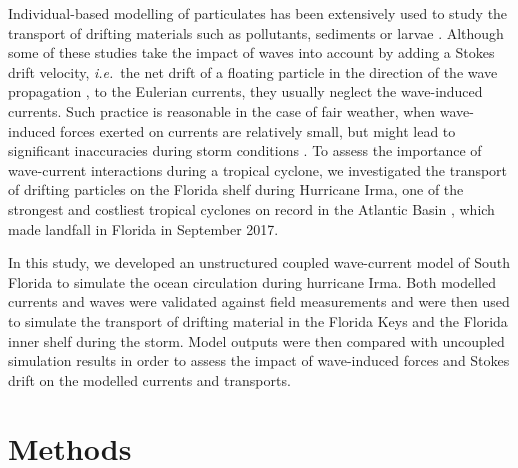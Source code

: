 \documentclass[preprint,12pt,authoryear]{elsarticle}
\newcommand{\ie}{{\it i.e.}\ }
\begin{document}
Individual-based modelling of particulates has been extensively used to study the transport of drifting materials such as pollutants, sediments or larvae \citep{le2012surface,liubartseva2018tracking, figueiredo2013synthesizing,frys2020fine}. Although some of these studies take the impact of waves into account by adding a Stokes drift velocity, \ie the net drift of a floating particle in the direction of the wave propagation \citep{van2018stokes}, to the Eulerian currents, they usually neglect the wave-induced currents. Such practice is reasonable in the case of fair weather, when wave-induced forces exerted on currents are relatively small, but might lead to significant inaccuracies during storm conditions \citep{rohrs2012observation,curcic2016hurricane}. To assess the importance of wave-current interactions during a tropical cyclone, we investigated the transport of drifting particles on the Florida shelf during Hurricane Irma, one of the strongest and costliest tropical cyclones on record in the Atlantic Basin \citep{xian2018brief}, which made landfall in Florida in September 2017.

In this study, we developed an unstructured coupled wave-current model of South Florida to simulate the ocean circulation during hurricane Irma. Both modelled currents and waves were validated against field measurements and were then used to simulate the transport of drifting material in the Florida Keys and the Florida inner shelf during the storm. Model outputs were then compared with uncoupled simulation results in order to assess the impact of wave-induced forces and Stokes drift on the modelled currents and transports.

\section{Methods}
\end{document}
